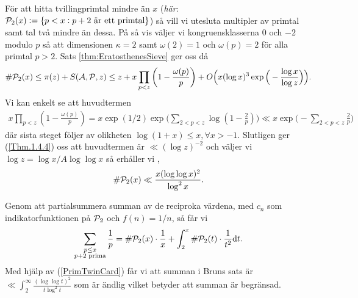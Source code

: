 För att hitta tvillingprimtal mindre än $x$ (\textit{här}: \( \P_2(x) := \{p < x : p + 2 \text{ är ett primtal}\}\)) så vill vi utesluta multipler av primtal samt tal två mindre än dessa. På så vis väljer vi kongruensklasserna $0$ och $-2$ modulo $p$ så att dimensionen \(\kappa = 2\) samt \(\omega(2) = 1\) och \(\omega(p) = 2\) för alla primtal $p > 2$. Sats \ref{thm:EratosthenesSieve} ger oss då 
\begin{align*}
    \card{\P_2(x)} \leq \pi(z) + \S{A}{P}{z} \leq z + x \prod_{p < z}\left( 1 - \frac{\omega(p)}{p} \right) + O\Big(x (\log x)^3 \exp \Big( - \frac{\log x}{\log z} \Big) \Big).
\end{align*}
Vi kan enkelt se att huvudtermen
\begin{align*}
    x \prod_{p < z}\left( 1 - \frac{\omega(p)}{p} \right) = x \exp(1/2) \exp \Bigg( \sum_{2 <p < z} \log \left( 1 - \frac{2}{p} \right) \Bigg) \ll x \exp \Bigg( - \sum_{2 <p < z} \frac{2}{p}  \Bigg) 
\end{align*}
där sista steget följer av olikheten \(\log(1 + x) \leq x, \forall x > -1\). Slutligen ger (\ref{Thm.1.4.4}) oss att huvudtermen är \(\ll (\log z)^{-2}\) och väljer vi \(\log z = \log x / A \log \log x\) så erhåller vi \cite[Sats 5.4.4]{cojocarumurty},
\begin{align} \label{PrimTwinCard}
    \card{\P_2(x)} \ll \frac{x (\log \log x)^2}{\log^2 x}.
\end{align}


Genom att partialsummera summan av de reciproka värdena, med \(c_n\) som indikatorfunktionen på \(\P_2\) och \(f(n) = 1 / n\), så får vi 
\begin{align*}
    \sum_{\substack{p \leq x \\ p + 2 \text{ prima}}} \frac{1}{p} = \card{\P_2(x)} \cdot \frac{1}{x} + \int_2^x \card{\P_2(t)} \cdot \frac{1}{t^2} \text{d}t . 
\end{align*}
Med hjälp av (\ref{PrimTwinCard}) får vi att summan i Bruns sats är \(\ll \int_2^\infty \frac{(\log \log t)^2}{t \log^2 t}\) som är ändlig vilket betyder att summan är begränsad. 